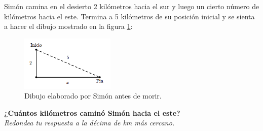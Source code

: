 \question[15]  Simón camina en el desierto 2 kilómetros hacia el sur y luego un cierto número de kilómetros hacia el este.
Termina a 5 kilómetros de su posición inicial y se sienta a hacer el dibujo mostrado en la figura \ref{fig:proverb_pitagoras_01}:
\begin{figure}[H]
    \begin{center}
        \includegraphics[width=0.4\textwidth]{../images/proverb_pitagoras_01.png}
    \end{center}
    \caption{Dibujo elaborado por Simón antes de morir.}
    \label{fig:proverb_pitagoras_01}
\end{figure}
\textbf{¿Cuántos kilómetros caminó Simón hacia el este?}\\
\textit{Redondea tu respuesta a la décima de km más cercano.}